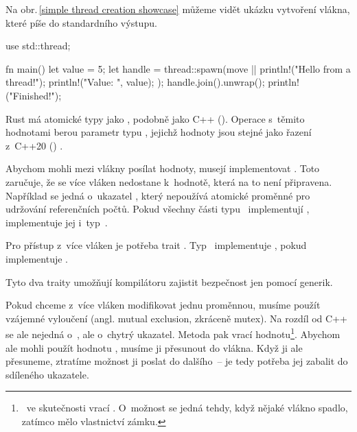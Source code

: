 \documentclass[main.tex]{subfiles}
\begin{document}
Na obr.\,\ref{simple thread creation showcase} můžeme vidět ukázku vytvoření vlákna, které
píše do standardního výstupu.

\obrazek
\begin{rustcode}
    use std::thread;

    fn main() {
        let value = 5;
        let handle = thread::spawn(move || {
            println!("Hello from a thread!");
            println!("Value: {}", value);
        });
        handle.join().unwrap();
        println!("Finished!");
    }
\end{rustcode}


Rust má atomické typy jako , podobně jako C++ ().
Operace s~těmito hodnotami berou parametr typu , jejichž hodnoty jsou
stejné jako řazení z~C++20 () \cite[sync/atomic]{ruststd}.


Abychom mohli mezi vlákny posílat hodnoty, musejí implementovat . Toto
zaručuje, že se více vláken nedostane k~hodnotě, která na to není připravena. Například se
jedná o~ukazatel , který nepoužívá atomické proměnné pro udržování
referenčních počtů. Pokud všechny části typu~ implementují ,
implementuje jej i~typ~. \cite[marker/trait.Send]{ruststd}

Pro přístup z~více vláken je potřeba trait . Typ~ implementuje
, pokud  implementuje .
\cite[marker/trait.Sync]{ruststd}

Tyto dva traity umožňují kompilátoru zajistit bezpečnost jen pomocí generik.


Pokud chceme z~více vláken modifikovat jednu proměnnou, musíme použít vzájemné vyloučení
(angl. mutual exclusion, zkráceně mutex). Na rozdíl od C++ se ale nejedná o~,
ale o~chytrý ukazatel. Metoda  pak vrací hodnotu\footnote{~ve skutečnosti
    vrací . O~možnost  se jedná tehdy, když nějaké vlákno spadlo,
    zatímco mělo vlastnictví zámku.
}. Abychom ale mohli použít hodnotu , musíme ji přesunout do vlákna. Když
ji ale přesuneme, ztratíme možnost ji poslat do dalšího~-- je tedy potřeba jej zabalit
do sdíleného ukazatele.
\end{document}
